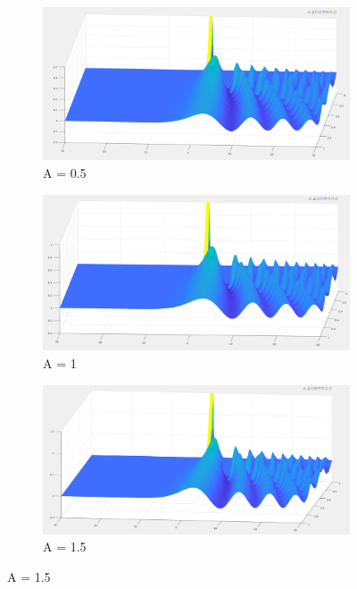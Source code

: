 \documentclass{article}
\begin{document}
\begin{figure}[H]
\centering
\begin{subfigure}[b]{85mm}
\includegraphics[scale=0.14]{figures/infl0p5V.png}
\caption{A = 0.5}
\label{fig:}
\end{subfigure}
\begin{subfigure}[b]{85mm}
\includegraphics[scale=0.14]{figures/infl1V.png}
\caption{A = 1}
\label{fig:}
\end{subfigure}
\begin{subfigure}[b]{85mm}
\includegraphics[scale=0.14]{figures/infl1p5V.png}
\caption{A = 1.5}
\label{fig:}
\end{subfigure}

\end{figure}
\end{document}
